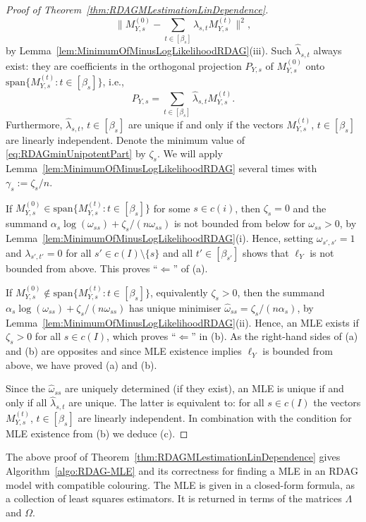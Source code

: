\begin{proof}[Proof of Theorem~\ref{thm:RDAGMLestimationLinDependence}]
	\begin{equation}\label{eq:RDAGminUnipotentPart}
		\Big\| M_{Y,s}^{(0)} - \sum_{t \in [\beta_s]} \lambda_{s,t} M_{Y,s}^{(t)} \Big\|^2 ,
	\end{equation}
	by Lemma~\ref{lem:MinimumOfMinusLogLikelihoodRDAG}(iii).
	Such $\hat{\lambda}_{s,t}$ always exist: they are coefficients in the orthogonal projection $P_{Y,s}$ of $M_{Y,s}^{(0)}$ onto $\mathrm{span} \big\lbrace M_{Y,s}^{(t)} : t \in [\beta_s] \big\rbrace$, i.e.,
	\[ P_{Y,s} = \sum_{t \in [\beta_s]} \hat{\lambda}_{s,t} M_{Y,s}^{(t)}. \]
	Furthermore, $\hat{\lambda}_{s,t}$, $t \in [\beta_s]$ are unique if and only if the vectors $M_{Y,s}^{(t)}$, $t \in [\beta_s]$ are linearly independent. Denote the minimum value of \eqref{eq:RDAGminUnipotentPart} by $\zeta_s$. We will apply Lemma~\ref{lem:MinimumOfMinusLogLikelihoodRDAG} several times with $\gamma_s := \zeta_s/n$.
	
	If $M_{Y,s}^{(0)} \in \mathrm{span} \big\lbrace M_{Y,s}^{(t)} : t \in [\beta_s] \big\rbrace$ for some $s \in c(i)$, then $\zeta_s = 0$ and the summand $\alpha_s \log(\omega_{ss}) + \zeta_s/ (n \omega_{ss})$ is not bounded from below for $\omega_{ss} > 0$, by Lemma~\ref{lem:MinimumOfMinusLogLikelihoodRDAG}(i). Hence, setting $\omega_{s',s'} = 1$ and $\lambda_{s',t'} = 0$ for all $s' \in c(I)\setminus \{s\}$ and all $t' \in [\beta_{s'}]$ shows that $\ell_Y$ is not bounded from above. This proves ``$\Leftarrow$'' of (a).
	
	If $M_{Y,s}^{(0)} \notin \mathrm{span} \big\lbrace M_{Y,s}^{(t)} : t \in [\beta_s] \big\rbrace$, equivalently $\zeta_s > 0$, then the summand $\alpha_s \log(\omega_{ss}) + \zeta_s/ (n\omega_{ss})$ has unique minimiser $\hat{\omega}_{ss} = \zeta_s /(n \alpha_s)$, by Lemma~\ref{lem:MinimumOfMinusLogLikelihoodRDAG}(ii). Hence, an MLE exists if $\zeta_s > 0$ for all $s \in c(I)$, which proves ``$\Leftarrow$'' in (b). As the right-hand sides of (a) and (b) are opposites and since MLE existence implies $\ell_{Y}$ is bounded from above, we have proved (a) and (b).
	
	Since the $\hat{\omega}_{ss}$ are uniquely determined (if they exist), an MLE is unique if and only if all $\hat{\lambda}_{s,t}$ are unique. The latter is equivalent to: for all $s \in c(I)$ the vectors $M_{Y,s}^{(t)}$, $t \in [\beta_s]$ are linearly independent. In combination with the condition for MLE existence from (b) we deduce (c).
\end{proof}

The above proof of Theorem~\ref{thm:RDAGMLestimationLinDependence} gives Algorithm~\ref{algo:RDAG-MLE} and its correctness for finding a MLE in an RDAG model with compatible colouring. The MLE is given in a closed-form formula, as a collection of least squares estimators. It is returned in terms of the matrices $\Lambda$ and $\Omega$.

